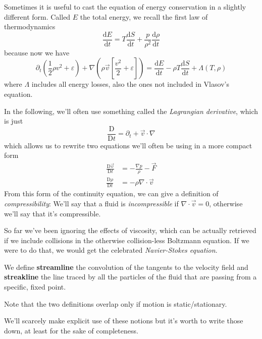 \par Sometimes it is useful to cast the equation of energy conservation in a slightly different form. Called $E$ the total energy, we recall the first law of thermodynamics
\begin{equation}
    \frac{\text{d}E}{\text{d}t} = T\frac{\text{d}S}{\text{d}t} + \frac{p}{\rho^{2}}\frac{\text{d}\rho}{\text{d}t}
    \label{eq:1st_thermo}
\end{equation}
because now we have 
\begin{equation}
    \partial_{t}\left(\frac{1}{2}\rho v^{2}+\varepsilon\right) +\nabla\left(\rho\vec{v}\left[\frac{v^{2}}{2}+\varepsilon\right]\right) = \frac{\text{d}E}{\text{d}t}-\rho T\frac{\text{d}S}{\text{d}t} + \Lambda(T,\rho)
\end{equation}
where $\Lambda$ includes all energy losses, also the ones not included in Vlasov’s equation.
\par In the following, we'll often use something called the \emph{Lagrangian derivative}, which is just
\begin{equation}
    \frac{\text{D}}{\text{D}t} = \partial_{t} + \vec{v}\cdot\nabla
    \label{eq:lagrangiander}
\end{equation}
which allows us to rewrite two equations we'll often be using in a more compact form 
\begin{align}
    \frac{\text{D}\vec{v}}{\text{D}t} &= -\frac{\nabla p}{\rho}-\vec{F}\\
    \frac{\text{D}\rho}{\text{D}t} &= -\rho\nabla\cdot\vec{v}
    \label{eq:lagrangianframe}
\end{align}
From this form of the continuity equation, we can give a definition of \emph{compressibility}: We'll say that a fluid is \emph{incompressible} if $\nabla\cdot\vec{v} = 0$, otherwise we'll say that it's compressible.
\par So far we've been ignoring the effects of viscosity, which can be actually retrieved if we include collisions in the otherwise collision-less Boltzmann equation. If we were to do that, we would get the celebrated \emph{Navier-Stokes equation}.
\par We define \textbf{streamline} the convolution of the tangents to the velocity field and \textbf{streakline} the line traced by all the particles of the fluid that are passing from a specific, fixed point.
\par Note that the two definitions overlap only if motion is static/stationary.
\par We'll scarcely make explicit use of these notions but it's worth to write those down, at least for the sake of completeness. 

